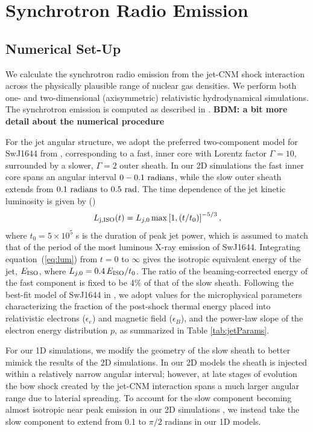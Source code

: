 \documentclass[usenatbib,fleqn]{mnras}
\begin{document}
\section{Synchrotron Radio Emission}

\label{sec:results}
\subsection{Numerical Set-Up}
\label{sec:numerical}
We calculate the synchrotron radio emission from the jet-CNM shock
interaction across the physically plausible range of nuclear gas
densities.  We perform both one- and two-dimensional (axisymmetric)
relativistic hydrodynamical simulations.  The synchrotron emission is
computed as described in \citet{Mimica+2015}.  {\bf BDM: a bit more
  detail about the numerical procedure}

For the jet angular structure, we adopt the preferred two-component
model for SwJ1644 from \citet{Mimica+2015}, corresponding to a fast,
inner core with Lorentz factor $\Gamma = 10$, surrounded by a slower,
$\Gamma=2$ outer sheath.  In our 2D simulations the fast inner core
spans an angular interval $0-0.1\ {\rm radians}$, while the slow outer
sheath extends from $0.1\ {\rm radians}$ to $0.5\ {\rm rad}$.  The
time dependence of the jet kinetic luminosity is given by
(\citealt{Mimica+2015})
\begin{equation}\label{eq:lum}
L_{\rm j, ISO}(t) = L_{j,0}\max\left[1, (t/t_0)\right]^{-5/3},
\end{equation}
where $t_0 = 5\times 10^5$ s is the duration of peak jet power, which
is assumed to match that of the period of the most luminous X-ray
emission of SwJ1644.  Integrating equation~(\ref{eq:lum}) from $t = 0$
to $\infty$ gives the isotropic equivalent energy of the jet, $E_{\rm
  ISO}$, where $L_{j,0}=0.4\, E_{\rm ISO}/t_0$.  The ratio of the
beaming-corrected energy of the fast component is fixed to be 4\% of
that of the slow sheath.  Following the best-fit model of SwJ1644 in
\citet{Mimica+2015}, we adopt values for the microphysical parameters
characterizing the fraction of the post-shock thermal energy placed
into relativistic electrons ($\epsilon_e$) and magnetic field
($\epsilon_B$), and the power-law slope of the electron energy
distribution $p$, as summarized in Table \ref{tab:jetParams}.

For our 1D simulations, we modify the geometry of the slow sheath to
better mimick the results of the 2D simulations.  In our 2D models the
sheath is injected within a relatively narrow angular interval;
however, at late stages of evolution the bow shock created by the
jet-CNM interaction spans a much larger angular range due to laterial
spreading.  To account for the slow component becoming almost
isotropic near peak emission in our 2D simulations \citep[bottom two
panels of Fig.~8 in][]{Mimica+2015}, we instead take the slow
component to extend from 0.1 to $\pi/2$ radians in our 1D models.
\end{document}

